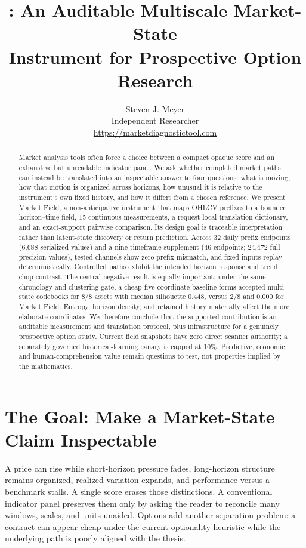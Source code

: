 \documentclass{article}
\title{\method{}: An Auditable Multiscale Market-State\\ Instrument for Prospective Option Research}
\author{
Steven J. Meyer\\
Independent Researcher\\
\url{https://marketdiagnostictool.com}\\
}
\newcommand{\method}{Market Field}
\begin{document}
\maketitle
\ifdefined\marketfieldsharecopy
{}
\fi

\begin{abstract}
Market analysis tools often force a choice between a compact opaque score and an exhaustive but unreadable indicator panel. We ask whether completed market paths can instead be translated into an inspectable answer to four questions: what is moving, how that motion is organized across horizons, how unusual it is relative to the instrument's own fixed history, and how it differs from a chosen reference. We present \method{}, a non-anticipative instrument that maps OHLCV prefixes to a bounded horizon--time field, 15 continuous measurements, a request-local translation dictionary, and an exact-support pairwise comparison. Its design goal is traceable interpretation rather than latent-state discovery or return prediction. Across 32 daily prefix endpoints (6,688 serialized values) and a nine-timeframe supplement (46 endpoints; 24,472 full-precision values), tested channels show zero prefix mismatch, and fixed inputs replay deterministically. Controlled paths exhibit the intended horizon response and trend--chop contrast. The central negative result is equally important: under the same chronology and clustering gate, a cheap five-coordinate baseline forms accepted multi-state codebooks for 8/8 assets with median silhouette 0.448, versus 2/8 and 0.000 for \method{}. Entropy, horizon density, and retained history materially affect the more elaborate coordinates. We therefore conclude that the supported contribution is an auditable measurement and translation protocol, plus infrastructure for a genuinely prospective option study. Current field snapshots have zero direct scanner authority; a separately governed historical-learning canary is capped at 10\%. Predictive, economic, and human-comprehension value remain questions to test, not properties implied by the mathematics.
\end{abstract}

\section{The Goal: Make a Market-State Claim Inspectable}

A price can rise while short-horizon pressure fades, long-horizon structure remains organized, realized variation expands, and performance versus a benchmark stalls. A single score erases those distinctions. A conventional indicator panel preserves them only by asking the reader to reconcile many windows, scales, and units unaided. Options add another separation problem: a contract can appear cheap under the current optionality heuristic while the underlying path is poorly aligned with the thesis.
\end{document}
